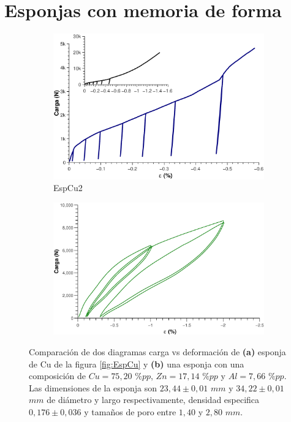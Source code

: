 \documentclass[a4paper,12pt,fleqn,twoside,openany]{book}
\begin{document}
\section{Esponjas con memoria de forma }
\label{sec:SMF}

\begin{figure}[h]
 \centering
    \begin{subfigure}{0.49\textwidth}
        \includegraphics[width=\textwidth]{Img/Introduccion/Cucompararesponja.eps}
        \caption{EspCu2}
        \label{fig:}
    \end{subfigure}
    \begin{subfigure}{0.45\textwidth}
        \includegraphics[width=\textwidth]{Img/Introduccion/EsponjacompararCu.eps}
        \caption{}
        \label{fig:EspA}
    \end{subfigure}

  \label{fig: proceso}
  \caption{Comparación de dos diagramas carga vs deformación de \textbf{(a)} esponja de Cu de la figura \ref{fig:EspCu} y \textbf{(b)} una esponja con una composición de $Cu=75,20$ $\%pp$, $Zn=17,14$ $\%pp$ y $Al=7,66$ $\%pp$. Las dimensiones de la esponja son $23,44 \pm0,01$ $mm$ y $34,22 \pm0,01$ $mm$ de diámetro y largo respectivamente, densidad especifica $0,176 \pm 0,036$ y tamaños de poro entre $1,40$ y $2,80$ $mm$. }
\end{figure}
\end{document}
